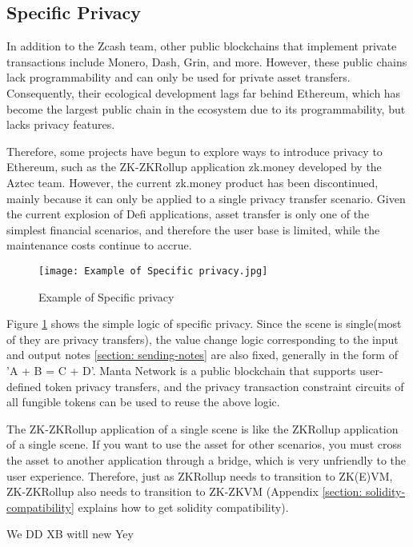 \subsection{Specific Privacy}

In addition to the Zcash\cite{website:Zcash} team, other public blockchains that implement private transactions include Monero\cite{website:Monero}, Dash\cite{website:Dash}, Grin\cite{website:Grin}, and more. However, these public chains lack programmability and can only be used for private asset transfers. Consequently, their ecological development lags far behind Ethereum\cite{website:Ethereum}, which has become the largest public chain in the ecosystem due to its programmability, but lacks privacy features.

Therefore, some projects have begun to explore ways to introduce privacy to Ethereum\cite{website:Ethereum}, such as the ZK-ZKRollup application zk.money\cite{website:zk.money} developed by the Aztec\cite{website:Aztec} team. However, the current zk.money\cite{website:zk.money} product has been discontinued, mainly because it can only be applied to a single privacy transfer scenario. Given the current explosion of Defi applications, asset transfer is only one of the simplest financial scenarios, and therefore the user base is limited, while the maintenance costs continue to accrue.
\begin{figure}[!ht]
    \centering
    \texttt{[image: Example of Specific privacy.jpg]}
    \caption{Example of Specific privacy}
    \label{fig:Example of Specific privacy}
\end{figure}

Figure \ref{fig:Example of Specific privacy} shows the simple logic of specific privacy. Since the scene is single(most of 
they are privacy transfers), the value change logic corresponding to the input and output 
notes \ref{section: sending-notes} are also fixed, generally in the form of 'A + B = C + D'. Manta Network\cite{website:Manta-network} is a 
public blockchain that supports user-defined token privacy transfers, and the privacy transaction 
constraint circuits of all fungible tokens can be used to reuse the above logic.

The ZK-ZKRollup application of a single scene is like the ZKRollup application of a 
single scene. If you want to use the asset for 
other scenarios, you must cross the asset to another application through a bridge, 
which is very unfriendly to the user experience. Therefore, just as ZKRollup needs to 
transition to ZK(E)VM, ZK-ZKRollup also needs to transition to ZK-ZKVM (Appendix \ref{section: solidity-compatibility} explains 
how to get solidity compatibility).


We DD XB witll new Yey 